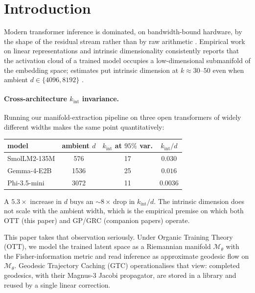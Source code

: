 \documentclass[11pt]{article}
\begin{document}
\clearpage
\tableofcontents
\clearpage

\section{Introduction}

Modern transformer inference is dominated, on bandwidth-bound hardware, by the
shape of the residual stream rather than by raw arithmetic
\cite{vaswani2017attention,llama3,williams2009roofline}. Empirical work on
linear representations and intrinsic dimensionality consistently reports that
the activation cloud of a trained model occupies a low-dimensional submanifold
of the embedding space; estimates put intrinsic dimension at $k\!\approx\!30$--$50$
even when ambient $d\in\{4096,8192\}$
\cite{elhage2022superposition,nakkiran2021deep}.

\paragraph{Cross-architecture $k_{\mathrm{int}}$ invariance.}
Running our manifold-extraction pipeline on three open transformers of
widely different widths makes the same point quantitatively:
\begin{center}\small
\begin{tabular}{lccc}\toprule
model & ambient $d$ & $k_{\mathrm{int}}$ at $95\%$ var. & $k_{\mathrm{int}}/d$\\\midrule
SmolLM2-135M   & 576  & 17 & $0.030$\\
Gemma-4-E2B    & 1536 & 25 & $0.016$\\
Phi-3.5-mini   & 3072 & 11 & $0.0036$\\\bottomrule
\end{tabular}\end{center}
A $5.3\times$ increase in $d$ buys an $\sim$8\,$\times$ drop in
$k_{\mathrm{int}}/d$.  The intrinsic dimension does not scale with the
ambient width, which is the empirical premise on which both OTT (this
paper) and GP/GRC (companion papers) operate.

This paper takes that observation seriously. Under Organic Training
Theory (OTT), we model the trained latent space as a Riemannian manifold
$\mathcal{M}_\theta$ with the Fisher-information metric and read inference as
approximate geodesic flow on $\mathcal{M}_\theta$. Geodesic Trajectory
Caching (GTC) operationalises that view: completed geodesics, with their
Magnus-3 Jacobi propagator, are stored in a library and reused by a single
linear correction.
\end{document}
